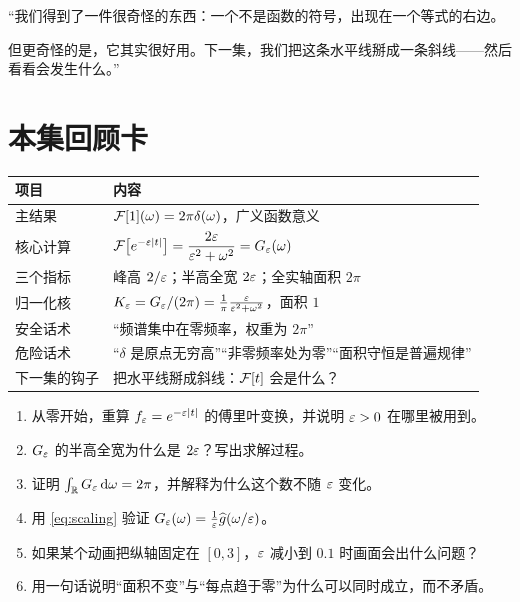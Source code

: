 \begin{scriptbox}[最后 30 秒的旁白骨架]
“我们得到了一件很奇怪的东西：一个不是函数的符号，出现在一个等式的右边。

但更奇怪的是，它其实很好用。下一集，我们把这条水平线掰成一条斜线——然后看看会发生什么。”
\end{scriptbox}

\section{本集回顾卡}

\begin{center}
\small
\renewcommand{\arraystretch}{1.4}
\begin{tabularx}{\textwidth}{@{}L{3.6cm}Y@{}}
\toprule
项目 & 内容 \\
\midrule
主结果 & $\mathcal{F}[1](\omega)=2\pi\delta(\omega)$，广义函数意义 \\
核心计算 & $\mathcal{F}\big[e^{-\varepsilon|t|}\big]=\dfrac{2\varepsilon}{\varepsilon^{2}+\omega^{2}}=G_\varepsilon(\omega)$ \\
三个指标 & 峰高 $2/\varepsilon$；半高全宽 $2\varepsilon$；全实轴面积 $2\pi$ \\
归一化核 & $K_\varepsilon=G_\varepsilon/(2\pi)=\frac{1}{\pi}\frac{\varepsilon}{\varepsilon^{2}+\omega^{2}}$，面积 $1$ \\
安全话术 & “频谱集中在零频率，权重为 $2\pi$” \\
危险话术 & “$\delta$ 是原点无穷高”“非零频率处为零”“面积守恒是普遍规律” \\
下一集的钩子 & 把水平线掰成斜线：$\mathcal{F}[t]$ 会是什么？ \\
\bottomrule
\end{tabularx}
\end{center}

\begin{quizbox}[EP01 自测]
\begin{enumerate}[leftmargin=1.6em,itemsep=0.35em]
\item 从零开始，重算 $f_\varepsilon=e^{-\varepsilon|t|}$ 的傅里叶变换，并说明 $\varepsilon>0$ 在哪里被用到。
\item $G_\varepsilon$ 的半高全宽为什么是 $2\varepsilon$？写出求解过程。
\item 证明 $\int_{\mathbb{R}}G_\varepsilon\mathop{}\!\mathrm{d}\omega=2\pi$，并解释为什么这个数不随 $\varepsilon$ 变化。
\item 用 \eqref{eq:scaling} 验证 $G_\varepsilon(\omega)=\frac{1}{\varepsilon}\widehat{g}(\omega/\varepsilon)$。
\item 如果某个动画把纵轴固定在 $[0,3]$，$\varepsilon$ 减小到 $0.1$ 时画面会出什么问题？
\item 用一句话说明“面积不变”与“每点趋于零”为什么可以同时成立，而不矛盾。
\end{enumerate}
\end{quizbox}

